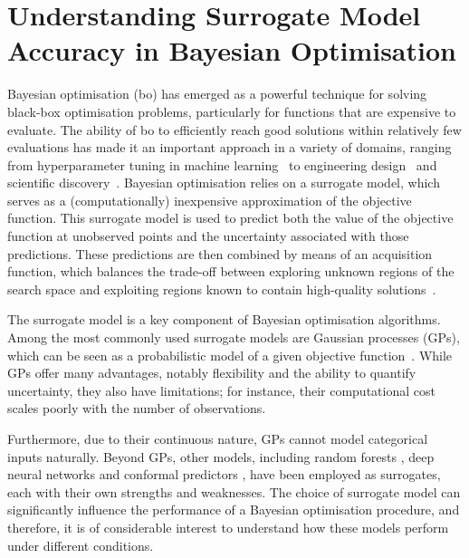 \chapter{Understanding Surrogate Model Accuracy in Bayesian Optimisation}
\label{ch:noisy_oracle}

Bayesian optimisation (\gls{bo}) has emerged as a powerful technique for solving black-box optimisation problems, particularly for functions that are expensive to evaluate. The ability of \gls{bo} to efficiently reach good solutions within relatively few evaluations has made it an important approach in a variety of domains, ranging from hyperparameter tuning in machine learning~\citep{SnoEtAl2012} to engineering design~\citep{Jones1998} and scientific discovery~\citep{Lookman2019}. Bayesian optimisation relies on a surrogate model, which serves as a (computationally) inexpensive approximation of the objective function. This surrogate model is used to predict both the value of the objective function at unobserved points and the uncertainty associated with those predictions. These predictions are then combined by means of an acquisition function, which balances the trade-off between exploring unknown regions of the search space and exploiting regions known to contain high-quality solutions~\citep{Garnett2023}.

The surrogate model is a key component of Bayesian optimisation algorithms. Among the most commonly used surrogate models are Gaussian processes (GPs), which 
can be seen as a probabilistic model of a given objective function~\citep{RasEtAl06}. 
While GPs offer many advantages, notably flexibility and the ability to quantify uncertainty, they also have limitations; for instance, their computational cost scales poorly with the number of observations.

Furthermore, due to their continuous nature, GPs cannot model categorical inputs naturally. Beyond GPs, other models, including random forests \citep{HutEtAl11}, deep neural networks \citep{Lakshminarayanan2017} and conformal predictors \citep{Shafer2008}, have been employed as surrogates, each with their own strengths and weaknesses. The choice of surrogate model can significantly influence the performance of a Bayesian optimisation procedure, and therefore, it is of considerable interest to understand how these models perform under different conditions.

